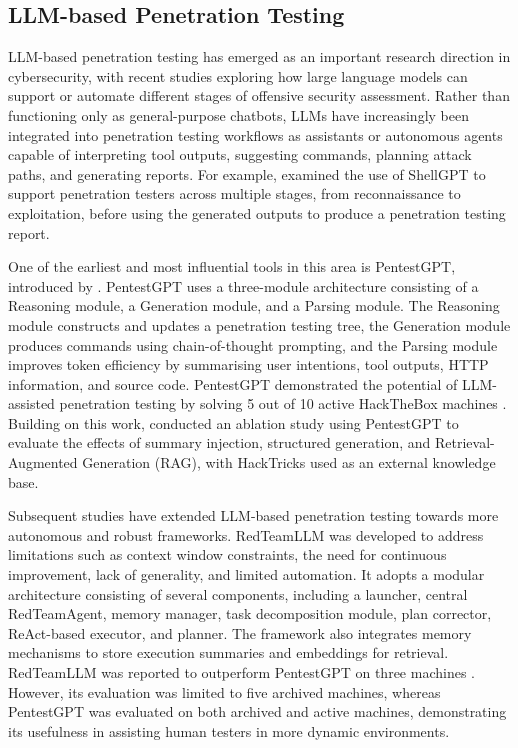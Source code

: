 \documentclass[acmtog]{acmart}
\begin{document}
\subsection{LLM-based Penetration Testing}

LLM-based penetration testing has emerged as an important research direction in cybersecurity, with recent studies exploring how large language models can support or automate different stages of offensive security assessment. Rather than functioning only as general-purpose chatbots, LLMs have increasingly been integrated into penetration testing workflows as assistants or autonomous agents capable of interpreting tool outputs, suggesting commands, planning attack paths, and generating reports. For example, \citet{hilario_generative_2024} examined the use of ShellGPT to support penetration testers across multiple stages, from reconnaissance to exploitation, before using the generated outputs to produce a penetration testing report.

One of the earliest and most influential tools in this area is PentestGPT, introduced by \citet{deng_pentestgpt_2024}. PentestGPT uses a three-module architecture consisting of a Reasoning module, a Generation module, and a Parsing module. The Reasoning module constructs and updates a penetration testing tree, the Generation module produces commands using chain-of-thought prompting, and the Parsing module improves token efficiency by summarising user intentions, tool outputs, HTTP information, and source code. PentestGPT demonstrated the potential of LLM-assisted penetration testing by solving 5 out of 10 active HackTheBox machines \cite{hacktheboxHackBox}. Building on this work, \citet{isozaki_towards_2025} conducted an ablation study using PentestGPT to evaluate the effects of summary injection, structured generation, and Retrieval-Augmented Generation (RAG), with HackTricks used as an external knowledge base.

Subsequent studies have extended LLM-based penetration testing towards more autonomous and robust frameworks. RedTeamLLM was developed to address limitations such as context window constraints, the need for continuous improvement, lack of generality, and limited automation. It adopts a modular architecture consisting of several components, including a launcher, central RedTeamAgent, memory manager, task decomposition module, plan corrector, ReAct-based executor, and planner. The framework also integrates memory mechanisms to store execution summaries and embeddings for retrieval. RedTeamLLM was reported to outperform PentestGPT on three machines \cite{challita_redteamllm_2025}. However, its evaluation was limited to five archived machines, whereas PentestGPT was evaluated on both archived and active machines, demonstrating its usefulness in assisting human testers in more dynamic environments.
\end{document}
